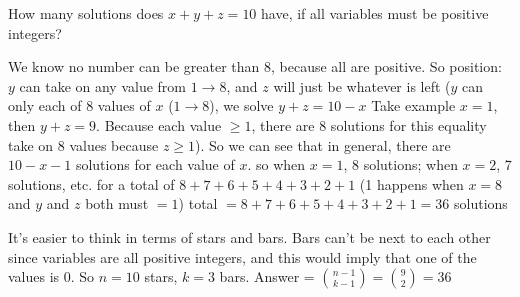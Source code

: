 \question How many solutions does $x + y + z = 10$ have, if all variables 
must be positive integers? 

\begin{solution}[1 in]
We know no number can be greater than 8, because all are positive.
So position: $y$ can take on any value from $1 \rightarrow 8$, and $z$ will just be 
whatever is left ($y$ can only each of 8 values of $x$ 
($1 \rightarrow 8$), we solve $y + z = 10 - x$
Take example $x = 1$, then $y + z = 9$. Because each value $\ge 1$, there 
are 8 solutions for this equality take on 8 values because $z \ge 1$).
So we can see that in general, there are $10-x-1$ solutions for each 
value of $x$.
so when $x = 1$, 8 solutions; when $x = 2$, 7 solutions, etc. for a total 
of $8 + 7 + 6 + 5 + 4 + 3 + 2 + 1$ (1 happens when $x=8$ and $y$ and $z$ both must $= 1$)
total $= 8 + 7 + 6 + 5 + 4 + 3 + 2 + 1 = 36 $ solutions

It's easier to think in terms of stars and bars. Bars can't be next to each 
other since variables are all positive integers, and this would imply that one of the values is 0. So $n = 10$ stars, 
$k = 3$ bars. Answer = ${n-1 \choose k-1} = {9 \choose 2} = 36$
\end{solution}